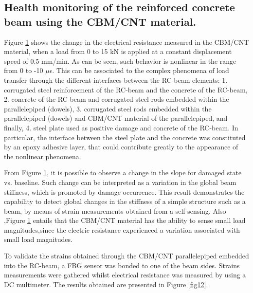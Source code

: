\documentclass[twocolumn]{bmcart}%
\begin{document}
\subsection{ Health monitoring of the reinforced concrete beam using the CBM/CNT material.}

Figure \ref{fig11} shows the change in the electrical resistance measured in the CBM/CNT material, when a load from 0 to 15 kN is applied at a constant displacement speed of 0.5 mm/min. As can be seen, such behavior is nonlinear in the range from 0 to -10 $\mu \epsilon$. This can be associated to the complex phenomena of load transfer through the different interfaces between the RC-beam elements: 1. corrugated steel reinforcement of the RC-beam and the concrete of the RC-beam, 2. concrete of the RC-beam and corrugated steel rods embedded within the parallelepiped (dowels), 3. corrugated steel rods embedded within the parallelepiped (dowels)  and CBM/CNT material of the parallelepiped, and finally, 4. steel plate used as positive damage and concrete of the RC-beam. In particular, the interface between the steel plate and the concrete was constituted by an epoxy adhesive layer, that could contribute greatly to the appearance of the nonlinear phenomena.

\begin{figure}[h!]
  \caption{
      }
      \label{fig11}
      \end{figure}


From Figure \ref{fig11}, it is possible to observe a change in the slope for damaged state vs. baseline. Such change can be interpreted as a variation in the global beam stiffness, which is promoted by damage occurrence. This result demonstrates the capability to detect global changes in the stiffness of a simple structure such as a beam, by means of strain measurements obtained from a self-sensing. Also ,Figure \ref{fig11}  entails that the CBM/CNT material has the ability to sense small load magnitudes,since the electric resistance experienced a variation associated with small load magnitudes.

To validate the strains obtained through the CBM/CNT parallelepiped embedded into the RC-beam, a FBG sensor was bonded to one of the beam sides. Strains measurements were gathered  whilst electrical resistance was measured by using a DC multimeter. The results obtained are presented in Figure \ref{fig12}.
\end{document}
